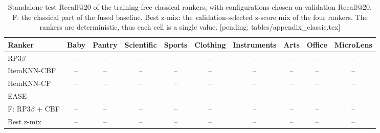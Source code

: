 \begin{table}[t]
\caption{Standalone test Recall@20 of the training-free classical rankers, with configurations chosen on validation Recall@20. F: the classical part of the fused baseline. Best z-mix: the validation-selected z-score mix of the four rankers. The rankers are deterministic, thus each cell is a single value. {\color{red}[pending: tables/appendix\_classic.tex]}}
\label{tab:classic_standalone}
\centering
\footnotesize
\setlength{\tabcolsep}{3.5pt}
\begin{tabular}{lccccccccc}
\toprule
Ranker & Baby & Pantry & Scientific & Sports & Clothing & Instruments & Arts & Office & MicroLens \\
\midrule
RP3$\beta$ & -- & -- & -- & -- & -- & -- & -- & -- & -- \\
ItemKNN-CBF & -- & -- & -- & -- & -- & -- & -- & -- & -- \\
ItemKNN-CF & -- & -- & -- & -- & -- & -- & -- & -- & -- \\
EASE & -- & -- & -- & -- & -- & -- & -- & -- & -- \\
F: RP3$\beta$ + CBF & -- & -- & -- & -- & -- & -- & -- & -- & -- \\
Best z-mix & -- & -- & -- & -- & -- & -- & -- & -- & -- \\
\bottomrule
\end{tabular}
\end{table}
